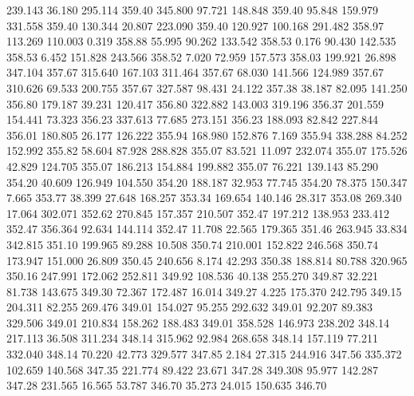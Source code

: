  239.143   36.180  295.114       359.40
 345.800   97.721  148.848       359.40
  95.848  159.979  331.558       359.40
 130.344   20.807  223.090       359.40
 120.927  100.168  291.482       358.97
 113.269  110.003    0.319       358.88
  55.995   90.262  133.542       358.53
   0.176   90.430  142.535       358.53
   6.452  151.828  243.566       358.52
   7.020   72.959  157.573       358.03
 199.921   26.898  347.104       357.67
 315.640  167.103  311.464       357.67
  68.030  141.566  124.989       357.67
 310.626   69.533  200.755       357.67
 327.587   98.431   24.122       357.38
  38.187   82.095  141.250       356.80
 179.187   39.231  120.417       356.80
 322.882  143.003  319.196       356.37
 201.559  154.441   73.323       356.23
 337.613   77.685  273.151       356.23
 188.093   82.842  227.844       356.01
 180.805   26.177  126.222       355.94
 168.980  152.876    7.169       355.94
 338.288   84.252  152.992       355.82
  58.604   87.928  288.828       355.07
  83.521   11.097  232.074       355.07
 175.526   42.829  124.705       355.07
 186.213  154.884  199.882       355.07
  76.221  139.143   85.290       354.20
  40.609  126.949  104.550       354.20
 188.187   32.953   77.745       354.20
  78.375  150.347    7.665       353.77
  38.399   27.648  168.257       353.34
 169.654  140.146   28.317       353.08
 269.340   17.064  302.071       352.62
 270.845  157.357  210.507       352.47
 197.212  138.953  233.412       352.47
 356.364   92.634  144.114       352.47
  11.708   22.565  179.365       351.46
 263.945   33.834  342.815       351.10
 199.965   89.288   10.508       350.74
 210.001  152.822  246.568       350.74
 173.947  151.000   26.809       350.45
 240.656    8.174   42.293       350.38
 188.814   80.788  320.965       350.16
 247.991  172.062  252.811       349.92
 108.536   40.138  255.270       349.87
  32.221   81.738  143.675       349.30
  72.367  172.487   16.014       349.27
   4.225  175.370  242.795       349.15
 204.311   82.255  269.476       349.01
 154.027   95.255  292.632       349.01
  92.207   89.383  329.506       349.01
 210.834  158.262  188.483       349.01
 358.528  146.973  238.202       348.14
 217.113   36.508  311.234       348.14
 315.962   92.984  268.658       348.14
 157.119   77.211  332.040       348.14
  70.220   42.773  329.577       347.85
   2.184   27.315  244.916       347.56
 335.372  102.659  140.568       347.35
 221.774   89.422   23.671       347.28
 349.308   95.977  142.287       347.28
 231.565   16.565   53.787       346.70
  35.273   24.015  150.635       346.70
